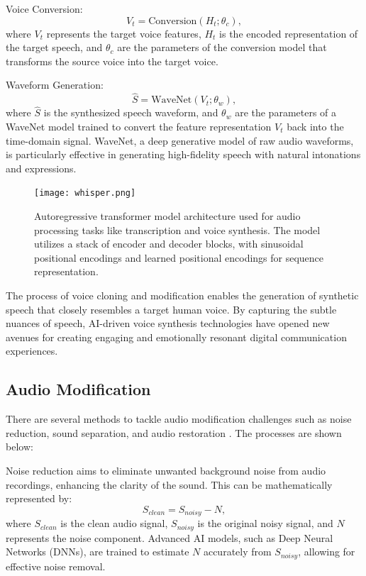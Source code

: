 \documentclass[11pt,a4paper,oneside]{report}
\begin{document}
Voice Conversion:
\begin{equation}
V_t = \text{Conversion}(H_t; \theta_c),
\end{equation}
where $V_t$ represents the target voice features, $H_t$ is the encoded representation of the target speech, and $\theta_c$ are the parameters of the conversion model that transforms the source voice into the target voice.

Waveform Generation:
\begin{equation}
\hat{S} = \text{WaveNet}(V_t; \theta_w),
\end{equation}
where $\hat{S}$ is the synthesized speech waveform, and $\theta_w$ are the parameters of a WaveNet \cite{oord2016wavenet} model trained to convert the feature representation $V_t$ back into the time-domain signal. WaveNet, a deep generative model of raw audio waveforms, is particularly effective in generating high-fidelity speech with natural intonations and expressions.

\begin{figure}[htbp]
  \centering
  \texttt{[image: whisper.png]}
  \caption{Autoregressive transformer model architecture used for audio processing tasks like transcription and voice synthesis. The model utilizes a stack of encoder and decoder blocks, with sinusoidal positional encodings and learned positional encodings for sequence representation. \cite{OpenAIWhisper}}
\end{figure}

The process of voice cloning and modification enables the generation of synthetic speech that closely resembles a target human voice. 
By capturing the subtle nuances of speech, AI-driven voice synthesis technologies have opened new avenues for creating engaging and emotionally resonant digital communication experiences. 



\subsection{Audio Modification}

There are several methods to tackle audio modification challenges such as noise reduction, sound separation, and audio restoration \cite{godsill2002digital}. 
The processes are shown below:

Noise reduction aims to eliminate unwanted background noise from audio recordings, enhancing the clarity of the sound. This can be mathematically represented by:
\begin{equation}
S_{clean} = S_{noisy} - N,
\end{equation}
where $S_{clean}$ is the clean audio signal, $S_{noisy}$ is the original noisy signal, and $N$ represents the noise component. Advanced AI models, such as Deep Neural Networks (DNNs), are trained to estimate $N$ accurately from $S_{noisy}$, allowing for effective noise removal.
\end{document}
